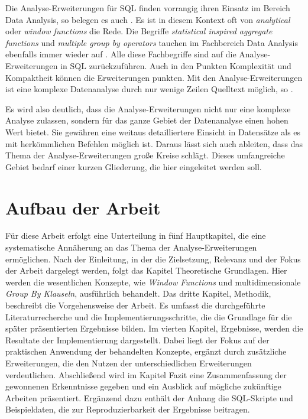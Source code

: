Die Analyse-Erweiterungen für SQL finden vorrangig ihren Einsatz im Bereich Data
Analysis, so belegen es auch \citet[S. 245]{FOTACHE2015243}. Es ist in diesem
Kontext oft von \textit{analytical} oder \textit{window functions} die Rede. Die
Begriffe \textit{statistical inspired aggregate functions} und \textit{multiple
group by operators} tauchen im Fachbereich Data Analysis ebenfalls immer wieder auf
\citep[vgl.][S. 247 - 248]{FOTACHE2015243}. Alle diese Fachbegriffe sind auf die
Analyse-Erweiterungen in SQL zurückzuführen. Auch in den Punkten Komplexität und
Kompaktheit können die Erweiterungen punkten. Mit den Analyse-Erweiterungen ist eine
komplexe Datenanalyse durch nur wenige Zeilen Quelltext möglich, so \citet[K. 1]{Maue2022}.

Es wird also deutlich, dass die Analyse-Erweiterungen nicht nur eine komplexe
Analyse zulassen, sondern für das ganze Gebiet der Datenanalyse einen hohen Wert
bietet. Sie gewähren eine weitaus detailliertere Einsicht in Datensätze als es
mit herkömmlichen Befehlen möglich ist. Daraus lässt sich auch ableiten, dass
das Thema der Analyse-Erweiterungen große Kreise schlägt. Dieses umfangreiche Gebiet
bedarf einer kurzen Gliederung, die hier eingeleitet werden soll.

\section{Aufbau der Arbeit}
\label{sec:aufbau_der_arbeit} Für diese Arbeit erfolgt eine Unterteilung in fünf
Hauptkapitel, die eine systematische Annäherung an das Thema der Analyse-Erweiterungen
ermöglichen. Nach der Einleitung, in der die Zielsetzung, Relevanz und der Fokus
der Arbeit dargelegt werden, folgt das Kapitel Theoretische Grundlagen. Hier
werden die wesentlichen Konzepte, wie \textit{Window Functions} und
multidimensionale \textit{Group By Klauseln}, ausführlich behandelt. Das dritte Kapitel,
Methodik, beschreibt die Vorgehensweise der Arbeit. Es umfasst die durchgeführte
Literaturrecherche und die Implementierungsschritte, die die Grundlage für die später
präsentierten Ergebnisse bilden. Im vierten Kapitel, Ergebnisse, werden die
Resultate der Implementierung dargestellt. Dabei liegt der Fokus auf der praktischen
Anwendung der behandelten Konzepte, ergänzt durch zusätzliche Erweiterungen, die
den Nutzen der unterschiedlichen Erweiterungen verdeutlichen. Abschließend wird
im Kapitel Fazit eine Zusammenfassung der gewonnenen Erkenntnisse gegeben und
ein Ausblick auf mögliche zukünftige Arbeiten präsentiert. Ergänzend dazu enthält
der Anhang die SQL-Skripte und Beispieldaten, die zur Reproduzierbarkeit der
Ergebnisse beitragen.

